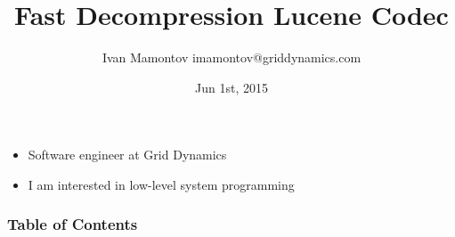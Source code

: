 \documentclass{beamer}
\title{Fast Decompression Lucene Codec}
\author{Ivan Mamontov imamontov@griddynamics.com}
\institute{Berlin Buzzwords}
\date{Jun 1st, 2015}
\begin{document}
{
\usebackgroundtemplate{}
    \begin{frame}[plain]
     \end{frame}
}
	\begin{frame}
    		\begin{itemize}
    			\frametitle{About me}
    		    \item Software engineer at Grid Dynamics
    		    \item I am interested in low-level system programming
		\end{itemize}
  	\end{frame}
  	\begin{frame}
  		\frametitle{Table of Contents}
  		\tableofcontents
  	\end{frame}
\end{document}
